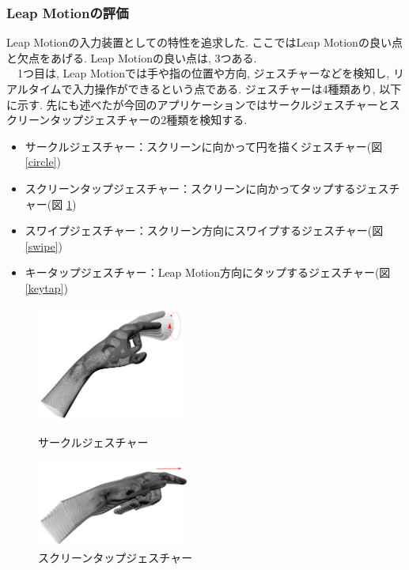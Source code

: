 \documentclass{funthesis}
\begin{document}
\subsubsection{Leap Motionの評価}
Leap Motionの入力装置としての特性を追求した. ここではLeap Motionの良い点と欠点をあげる. Leap Motionの良い点は, 3つある. \\ 
　1つ目は, Leap Motionでは手や指の位置や方向, ジェスチャーなどを検知し, リアルタイムで入力操作ができるという点である. ジェスチャーは4種類あり, 以下に示す. 先にも述べたが今回のアプリケーションではサークルジェスチャーとスクリーンタップジェスチャーの2種類を検知する. \\

\begin{itemize}
\setlength{\itemsep}{-0.5mm} %
  \setlength{\parskip}{-0.5mm} %
 \item サークルジェスチャー：スクリーンに向かって円を描くジェスチャー(図 \ref{circle})
 \item スクリーンタップジェスチャー：スクリーンに向かってタップするジェスチャー(図 \ref{sctap})
 \item スワイプジェスチャー：スクリーン方向にスワイプするジェスチャー(図 \ref{swipe})
 \item キータップジェスチャー：Leap Motion方向にタップするジェスチャー(図 \ref{keytap})
\end{itemize}

\begin{figure}[H]
 \begin{minipage}{0.5\hsize}
  \begin{center}
  \includegraphics[width=50mm]{./img/Circle.png}
  \end{center}
  \caption{サークルジェスチャー}
  \label{circle}
 \end{minipage}
 \begin{minipage}{0.5\hsize}
  \begin{center}
  \includegraphics[width=50mm]{./img/ScTap.png}
  \end{center}
  \caption{スクリーンタップジェスチャー}
  \label{sctap}
  \end{minipage}
\end{figure}
\end{document}
